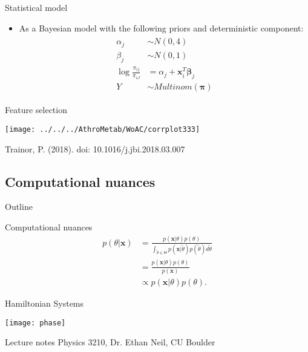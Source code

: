 \documentclass[xcolor=dvipsnames]{beamer}
\begin{document}
\begin{frame}{Statistical model}
	\vspace{-10.5pt}
	\begin{itemize}
		\item As a Bayesian model with the following priors and deterministic component:
		\begin{align*}
		\begin{split}
		\alpha_j &\sim N(0,4) \\
		\beta_j &\sim N(0,1) \\
		\log \frac{\pi_{ij}}{\pi_{iJ}} &= \alpha_j + \textbf{x}_i^T \boldsymbol{\beta}_j \\
		Y &\sim Multinom(\boldsymbol{\pi})
		\end{split}
		\end{align*}
	\end{itemize}
\end{frame}

\begin{frame}{Feature selection}
	\vspace{-10pt}
	\begin{center}
		\texttt{[image: ../../../AthroMetab/WoAC/corrplot333]}
		
		Trainor, P. (2018). doi: 10.1016/j.jbi.2018.03.007 
	\end{center}
\end{frame}

\subsection{Computational nuances}
\begin{frame}{Outline}
	\vspace{-10.5pt}
	\tableofcontents[currentsection,subsectionstyle=show/shaded/hide]
\end{frame}

\begin{frame}{Computational nuances}
		\begin{align*}
		p(\theta|\textbf{x})&=\frac{p(\textbf{x}|\theta)p(\theta)}{\int_{\tilde{\theta} \in \Theta} p(\textbf{x}|\tilde{\theta})p(\tilde{\theta})d\tilde{\theta}}\\ &=\frac{p(\textbf{x}|\theta)p(\theta)}{p(\textbf{x})}\\
		&\propto p(\textbf{x}|\theta)p(\theta).
		\end{align*}
\end{frame}

\begin{frame}{Hamiltonian Systems}
	\vspace{-5pt}
	\begin{center}
		\texttt{[image: phase]}
		
		Lecture notes Physics 3210, Dr. Ethan Neil, CU Boulder
	\end{center}
\end{frame}
\end{document}
